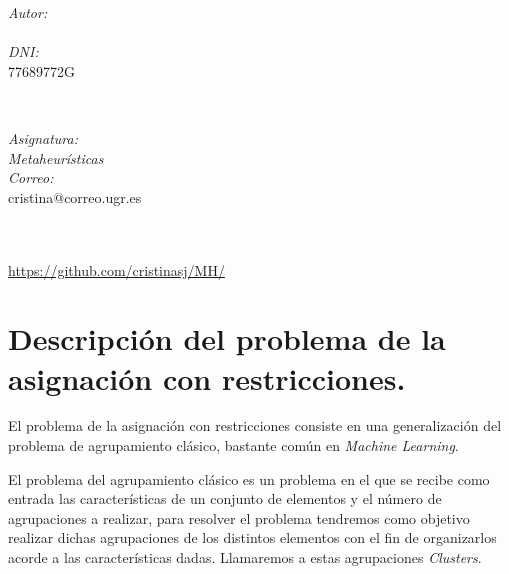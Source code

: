 \documentclass[12pt, spanish]{article}
\makeatletter
\let\theauthor\@author
\let\thedate\@date
\makeatother
\begin{document}
\begin{titlepage}
    \begin{minipage}{0.4\textwidth}
        \begin{flushleft} \large
            \emph{Autor:}\\
            \theauthor\\ 
			 \emph{DNI:}\\
            77689772G
            \end{flushleft}
            \end{minipage}~
            \begin{minipage}{0.4\textwidth}
            \begin{flushright} \large
            \emph{Asignatura: \\
            Metaheurísticas}   \\     
            \emph{Correo:}\\
            cristina@correo.ugr.es           
        \end{flushright}
    \end{minipage}\\[0.5cm]
  
    {\large \thedate}\\[0.5cm]
    {\url{https://github.com/cristinasj/MH/}}
    {\doclicenseThis}
 	
    \vfill
    
\end{titlepage}


\tableofcontents
\pagebreak



\section{Descripción del problema de la asignación con restricciones.}

El problema de la asignación con restricciones consiste en una generalización del problema de agrupamiento clásico, bastante común en \textit{Machine Learning}.

El problema del agrupamiento clásico es un problema en el que se recibe como entrada las características de un conjunto de elementos y el número de agrupaciones a realizar, para resolver el problema tendremos como objetivo realizar dichas agrupaciones de los distintos elementos con el fin de organizarlos acorde a las características dadas. Llamaremos a estas agrupaciones \textit{Clusters}.
\end{document}
